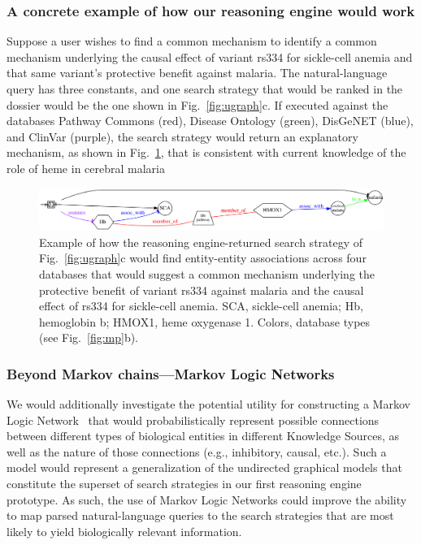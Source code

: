 \documentclass[11pt,notitlepage]{article}
\begin{document}
\subsubsection{A concrete example of how our reasoning engine would work}
Suppose a user wishes to find a common mechanism to identify a common mechanism
underlying the causal effect of variant rs334 for sickle-cell anemia and that
same variant's protective benefit against malaria. The natural-language query
has three constants, and one search strategy that would be ranked in the dossier
would be the one shown in Fig.~\ref{fig:ugraph}c. If executed against the
databases Pathway Commons (red), Disease Ontology (green), DisGeNET (blue), and
ClinVar (purple), the search strategy would return an explanatory mechanism, as
shown in Fig.~\ref{fig:malaria}, that is consistent with current knowledge of
the role of heme in cerebral malaria~\cite{Ferreira:2011ff}
\begin{figure}[h!]
     \includegraphics[width=6in]{net5.png} 
     \caption{Example of how the reasoning engine-returned search strategy of
       Fig.~\ref{fig:ugraph}c would find entity-entity associations across four
       databases that would suggest a common mechanism underlying the
       protective benefit of variant rs334 against malaria and the causal effect
       of rs334 for sickle-cell anemia. SCA, sickle-cell anemia; Hb,
       hemoglobin b; HMOX1, heme oxygenase 1.  Colors, database
       types (see Fig.~\ref{fig:mp}b).}
  \label{fig:malaria}
\end{figure}

\subsubsection{Beyond Markov chains---Markov Logic Networks}
We would additionally investigate the potential utility for constructing a
Markov Logic Network~\cite{Domingos:2012wi,domingos20071} that would
probabilistically represent possible connections between different types of
biological entities in different Knowledge Sources, as well as the nature of
those connections (e.g., inhibitory, causal, etc.). Such a model would represent
a generalization of the undirected graphical models that constitute the superset
of search strategies in our first reasoning engine prototype. As such, the use
of Markov Logic Networks could improve the ability to map parsed
natural-language queries to the search strategies that are most likely to yield
biologically relevant information.
\end{document}
